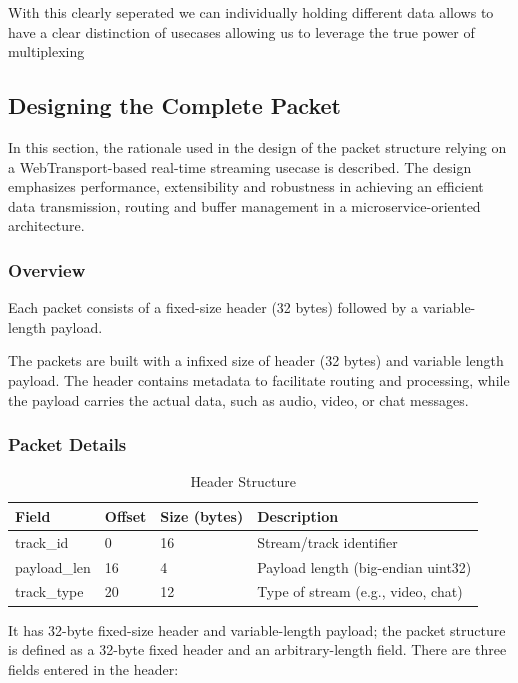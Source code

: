 {With this clearly seperated we can individually holding different data allows to have a clear distinction of usecases allowing us to leverage the true power of multiplexing


\subsection{Designing the Complete Packet}

In this section, the rationale used in the design of the packet structure relying on a WebTransport-based real-time streaming usecase is described. The design emphasizes performance, extensibility and robustness in achieving an efficient data transmission, routing and buffer management in a microservice-oriented architecture.

\subsubsection{Overview}
Each packet consists of a fixed-size header (32 bytes) followed by a variable-length payload. 

The packets are built with a infixed size of header (32 bytes) and variable length payload. The header contains metadata to facilitate routing and processing, while the payload carries the actual data, such as audio, video, or chat messages.


\subsubsection{Packet Details}

\begin{table}[h]
\centering
\begin{tabular}{|l|l|l|l|}
\hline
\textbf{Field} & \textbf{Offset} & \textbf{Size (bytes)} & \textbf{Description} \\
\hline
track\_id & 0 & 16 & Stream/track identifier \\
payload\_len & 16 & 4 & Payload length (big-endian uint32) \\
track\_type & 20 & 12 & Type of stream (e.g., video, chat) \\
\hline
\end{tabular}
\caption{Header Structure}
\label{tab:header_structure}
\end{table}

It has 32-byte fixed-size header and variable-length payload; the packet structure is defined as a 32-byte fixed header and an arbitrary-length field. There are three fields entered in the header:

}
